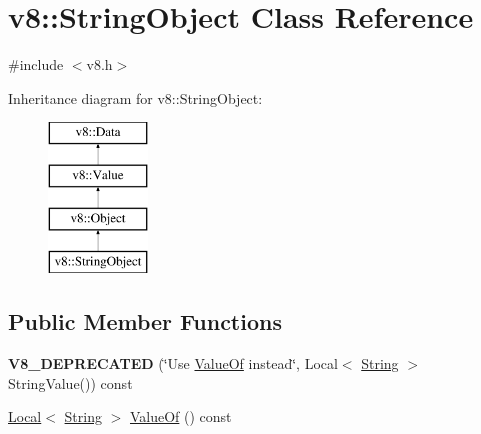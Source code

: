 \hypertarget{classv8_1_1_string_object}{}\section{v8\+:\+:String\+Object Class Reference}
\label{classv8_1_1_string_object}


{\ttfamily \#include $<$v8.\+h$>$}

Inheritance diagram for v8\+:\+:String\+Object\+:\begin{figure}[H]
\begin{center}
\leavevmode
\includegraphics[height=4.000000cm]{classv8_1_1_string_object}
\end{center}
\end{figure}
\subsection*{Public Member Functions}
\begin{DoxyCompactItemize}
\item 
\hypertarget{classv8_1_1_string_object_ace95cca826ccd5d9f994d1a153dd7050}{}{\bfseries V8\+\_\+\+D\+E\+P\+R\+E\+C\+A\+T\+E\+D} (\char`\"{}Use \hyperlink{classv8_1_1_string_object_a96bd6c736a0272ab7e683038953077e4}{Value\+Of} instead\char`\"{}, Local$<$ \hyperlink{classv8_1_1_string}{String} $>$ String\+Value()) const \label{classv8_1_1_string_object_ace95cca826ccd5d9f994d1a153dd7050}

\item 
\hyperlink{classv8_1_1_local}{Local}$<$ \hyperlink{classv8_1_1_string}{String} $>$ \hyperlink{classv8_1_1_string_object_a96bd6c736a0272ab7e683038953077e4}{Value\+Of} () const 
\end{DoxyCompactItemize}

